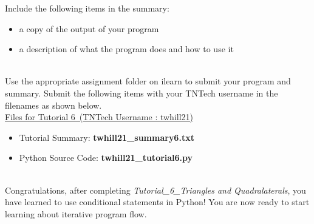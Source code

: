 \documentclass[12pt]{article}
\newcommand{\MNUM}{6} %
\newcommand{\TNAME}{Triangles and Quadralaterals} %
\begin{document}
\begin{description}[labelindent=1cm]
        Include the following items in the summary:
        \begin{itemize}

            \item a copy of the output of your program
            \item a description of what the program does and how to use it

        \end{itemize}

        \item[\textbf{\underline{Submission:}}] \hfill \vspace{3mm}\\ 
        Use the appropriate assignment folder on ilearn to submit your program and summary. Submit the following items with your TNTech username in the filenames as shown below. \vspace{0mm}\\

        \underline{Files for Tutorial \MNUM\ (TNTech Username : twhill21)}

        \begin{itemize}

            \item Tutorial Summary: \textbf{ twhill21\_summary\MNUM .txt}
            \item Python Source Code: \textbf{ twhill21\_tutorial\MNUM .py}

        \end{itemize}

        \item[\textbf{\underline{Tutorial Complete:}}] \hfill \vspace{3mm}\\ 
        Congratulations, after completing {\it Tutorial\_\MNUM\_\TNAME}, you have learned to use conditional statements in Python! You are now ready to start learning about iterative program flow. \\

    \end{description}
 
\end{document}
